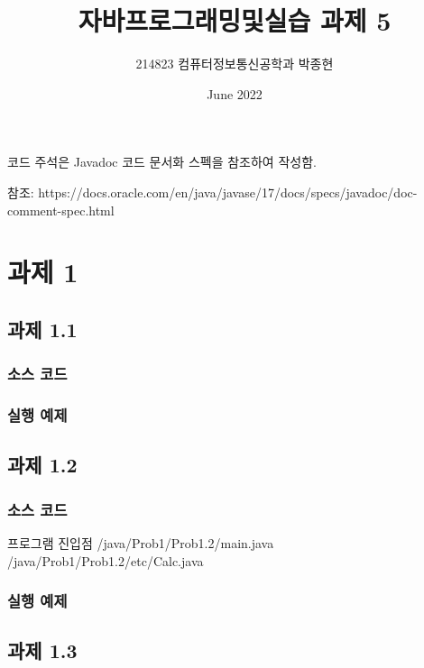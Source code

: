 \documentclass{article}
\title{자바프로그래밍및실습 과제 5}
\author{214823 컴퓨터정보통신공학과 박종현}
\date{June 2022}
\theoremstyle{nonumberplain}
\begin{document}
\maketitle
\pagebreak


코드 주석은 Javadoc 코드 문서화 스펙을 참조하여 작성함.

참조: https://docs.oracle.com/en/java/javase/17/docs/specs/javadoc/doc-comment-spec.html


\section{과제 1}

\subsection{과제 1.1}
\subsubsection{소스 코드}
\subsubsection{실행 예제}

\subsection{과제 1.2}
\subsubsection{소스 코드}
프로그램 진입점
/java/Prob1/Prob1.2/main.java
/java/Prob1/Prob1.2/etc/Calc.java
\subsubsection{실행 예제}

\subsection{과제 1.3}
\end{document}
